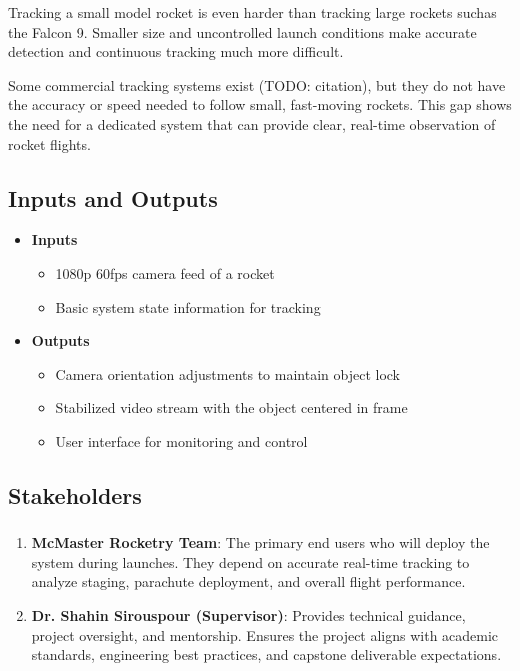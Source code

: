 \documentclass{article}
\begin{document}
Tracking a small model rocket is even harder than tracking large rockets suchas
the Falcon 9. Smaller size and uncontrolled launch conditions make accurate
detection and continuous tracking much more difficult.

Some commercial tracking systems exist (TODO: citation), but they do not have
the accuracy or speed needed to follow small, fast-moving rockets. This gap
shows the need for a dedicated system that can provide clear, real-time
observation of rocket flights.

\subsection{Inputs and Outputs}
\begin{itemize}
    \item \textbf{Inputs}
          \begin{itemize}
              \item 1080p 60fps camera feed of a rocket
              \item Basic system state information for tracking
          \end{itemize}

    \item \textbf{Outputs}
          \begin{itemize}
              \item Camera orientation adjustments to maintain object lock
              \item Stabilized video stream with the object centered in frame
              \item User interface for monitoring and control
          \end{itemize}
\end{itemize}

\subsection{Stakeholders}

\subsubsection*{\color{blue}{Direct Stakeholders}}
\begin{enumerate}
    \item \textbf{McMaster Rocketry Team}: The primary end users who
          will deploy the system during launches. They depend on accurate
          real-time tracking to analyze staging, parachute deployment, and
          overall flight performance.

    \item \textbf{Dr. Shahin Sirouspour (Supervisor)}: Provides
          technical guidance, project oversight, and mentorship. Ensures
          the project aligns with academic standards, engineering best
          practices, and capstone deliverable expectations.
\end{enumerate}
\end{document}
